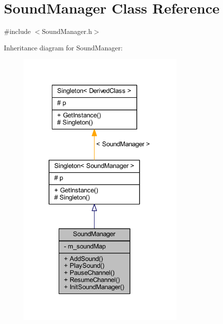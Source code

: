 \hypertarget{class_sound_manager}{}\section{Sound\+Manager Class Reference}
\label{class_sound_manager}


{\ttfamily \#include $<$Sound\+Manager.\+h$>$}



Inheritance diagram for Sound\+Manager\+:\nopagebreak
\begin{figure}[H]
\begin{center}
\leavevmode
\includegraphics[width=237pt]{class_sound_manager__inherit__graph}
\end{center}
\end{figure}


